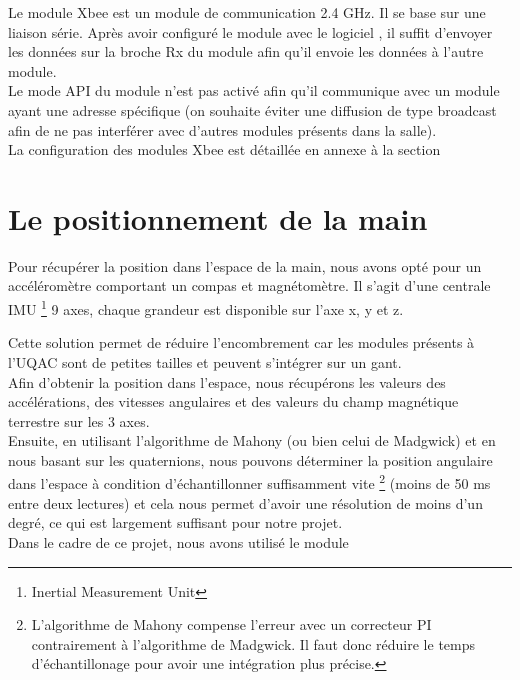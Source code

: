 {Le module Xbee est un module de communication 2.4 GHz. Il se base sur une liaison série.
Après avoir configuré le module avec le logiciel , il suffit d’envoyer les données sur la broche Rx du module afin qu’il envoie les données à l’autre module.\\
Le mode API du module n’est pas activé afin qu’il communique avec un module ayant une adresse spécifique (on souhaite éviter une diffusion de type broadcast afin de ne pas interférer avec d’autres modules présents dans la salle).\\

La configuration des modules Xbee est détaillée en annexe à la section  \link{\ref{xbee}}

\section{Le positionnement de la main}

Pour récupérer la position dans l’espace de la main, nous avons opté pour un accéléromètre comportant un compas et magnétomètre. Il s'agit d'une centrale IMU \footnote{Inertial Measurement Unit} 9 axes, chaque grandeur est disponible sur l'axe x, y et z.\\

 
Cette solution permet de réduire l'encombrement car les modules présents à l'UQAC sont de petites tailles et peuvent s'intégrer sur un gant.\\

Afin d'obtenir la position dans l'espace, nous récupérons les valeurs des accélérations, des vitesses angulaires et des valeurs du champ magnétique terrestre sur les 3 axes. \\
Ensuite, en utilisant l’algorithme de Mahony (ou bien celui de Madgwick) et en nous basant sur les quaternions, nous pouvons déterminer la position angulaire dans l'espace à condition d'échantillonner suffisamment vite \footnote{L'algorithme de Mahony compense l'erreur avec un correcteur PI contrairement à l'algorithme de Madgwick. Il faut donc réduire le temps d'échantillonage pour avoir une intégration plus précise.} (moins de 50 ms entre deux lectures) et cela nous permet d'avoir une résolution de moins d’un degré, ce qui est largement suffisant pour notre projet.\\

Dans le cadre de ce projet, nous avons utilisé le module 

}
